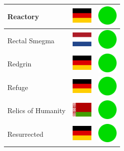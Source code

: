 \documentclass[12pt, a4paper, twoside]{report}
\begin{document}
\begin{center}
\begin{longtable}{|p{5cm}|p{2cm}|p{2cm}|}
 Reactory                                                   & \includegraphics[width=1cm]{../4x3/de} &   \includegraphics[width=1cm]{../likes/y} \\ \hline
 Rectal Smegma                                              & \includegraphics[width=1cm]{../4x3/nl} &   \includegraphics[width=1cm]{../likes/y} \\ \hline
 Redgrin                                                    & \includegraphics[width=1cm]{../4x3/de} &   \includegraphics[width=1cm]{../likes/y} \\ \hline
 Refuge                                                     & \includegraphics[width=1cm]{../4x3/de} &   \includegraphics[width=1cm]{../likes/y} \\ \hline
 Relics of Humanity                                         & \includegraphics[width=1cm]{../4x3/by} &   \includegraphics[width=1cm]{../likes/y} \\ \hline
 Resurrected                                                & \includegraphics[width=1cm]{../4x3/de} &   \includegraphics[width=1cm]{../likes/y} \\ \hline

\end{longtable}
\end{center}
\end{document}
